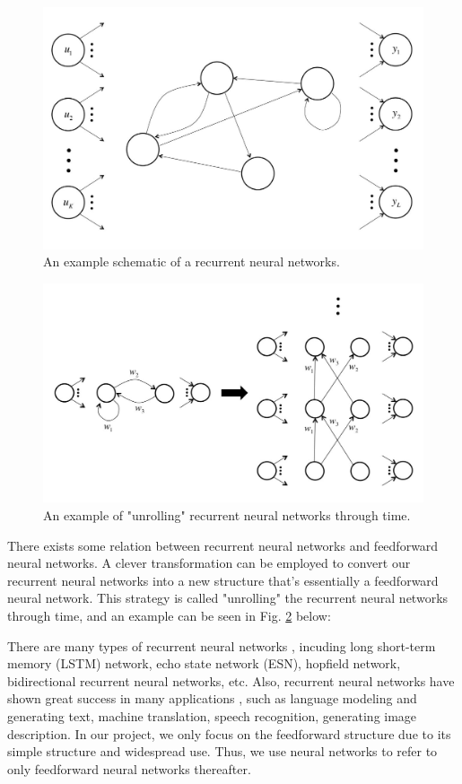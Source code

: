 \documentclass[journal,a4paper,onecolumn,11pt]{IEEEtran}
\begin{document}
\begin{figure}[!t] 
	\centering
	\includegraphics[scale=0.6]{recurrentNN.jpg}
	\caption{An example schematic of a recurrent neural networks.}
	\label{fig:recurrentNN}
\end{figure}

\begin{figure}[!t] 
	\centering
	\includegraphics[scale=0.6]{unrollingRNN.jpg}
	\caption{An example of "unrolling" recurrent neural networks through time.}
	\label{fig:unrollingRNN}
\end{figure}

There exists some relation between recurrent neural networks and feedforward neural networks. A clever transformation can be employed to convert our recurrent neural networks into a new structure that's essentially a feedforward neural network. This strategy is called "unrolling" the recurrent neural networks through time, and an example can be seen in Fig. \ref{fig:unrollingRNN} below:

There are many types of recurrent neural networks \cite{bib:RNN2}, incuding long short-term memory (LSTM) network, echo state network (ESN), hopfield network, bidirectional recurrent neural networks, etc. Also, recurrent neural networks have shown great success in many applications \cite{bib:RNN3}, such as language modeling and generating text, machine translation, speech recognition, generating image description. In our project, we only focus on the feedforward structure due to its simple structure and widespread use. Thus, we use neural networks to refer to only feedforward neural networks thereafter.
\end{document}
